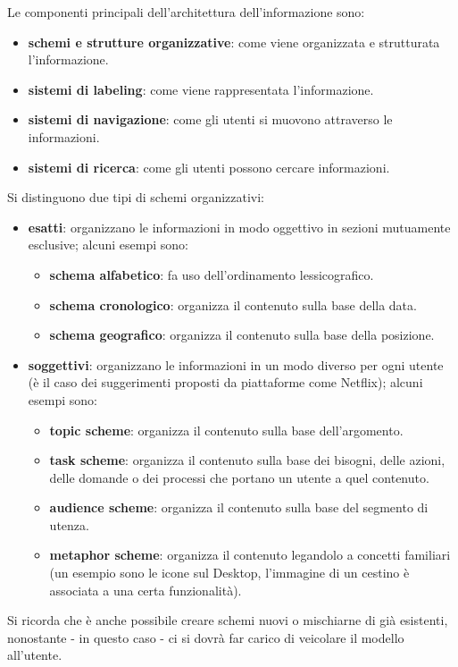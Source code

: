 Le componenti principali dell'architettura dell'informazione sono:
\begin{itemize}
	\itemsep-0.3em
	\item \textbf{schemi e strutture organizzative}: come viene organizzata e strutturata l'informazione.
	\item \textbf{sistemi di labeling}: come viene rappresentata l'informazione.
	\item \textbf{sistemi di navigazione}: come gli utenti si muovono attraverso le informazioni.
	\item \textbf{sistemi di ricerca}: come gli utenti possono cercare informazioni.
\end{itemize}

Si distinguono due tipi di schemi organizzativi:
\begin{itemize}
	\itemsep-0.3em
	\item \textbf{esatti}: organizzano le informazioni in modo oggettivo in sezioni mutuamente esclusive; alcuni esempi sono:
	\vspace{-3mm}
	\begin{itemize}
		\itemsep-0.3em
		\item \textbf{schema alfabetico}: fa uso dell'ordinamento lessicografico.
		\item \textbf{schema cronologico}: organizza il contenuto sulla base della data.
		\item \textbf{schema geografico}: organizza il contenuto sulla base della posizione.
	\end{itemize}
	\item \textbf{soggettivi}: organizzano le informazioni in un modo diverso per ogni utente (è il caso dei suggerimenti proposti da piattaforme come
	Netflix); alcuni esempi sono:
	\vspace{-3mm}
	\begin{itemize}
		\itemsep-0.3em
		\item \textbf{topic scheme}: organizza il contenuto sulla base dell'argomento.
		\item \textbf{task scheme}: organizza il contenuto sulla base dei bisogni, delle azioni, delle domande o dei processi che portano un utente a quel
		contenuto.
		\item \textbf{audience scheme}: organizza il contenuto sulla base del segmento di utenza.
		\item \textbf{metaphor scheme}: organizza il contenuto legandolo a concetti familiari (un esempio sono le icone sul Desktop, l'immagine di un
		cestino è associata a una certa funzionalità).
	\end{itemize}
\end{itemize}
Si ricorda che è anche possibile creare schemi nuovi o mischiarne di già esistenti, nonostante - in questo caso - ci si dovrà far carico di veicolare
il modello all'utente.

